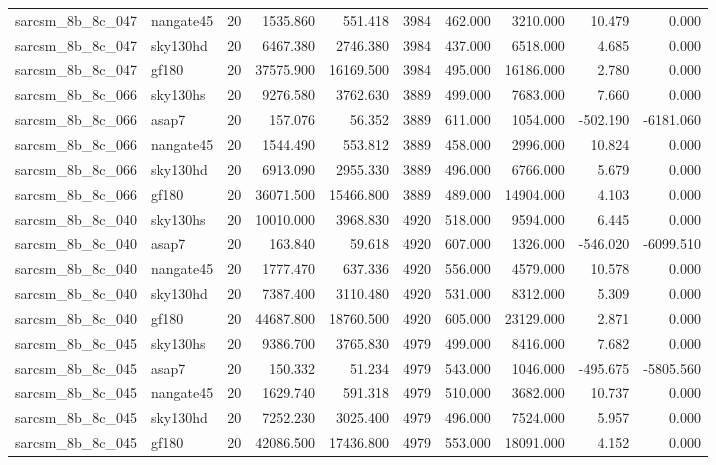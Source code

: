 \begin{longtable}{llrrrrrrrr}
sarcsm\_8b\_8c\_047 & nangate45 & 20 & 1535.860 & 551.418 & 3984 & 462.000 & 3210.000 & 10.479 & 0.000 \\
sarcsm\_8b\_8c\_047 & sky130hd & 20 & 6467.380 & 2746.380 & 3984 & 437.000 & 6518.000 & 4.685 & 0.000 \\
sarcsm\_8b\_8c\_047 & gf180 & 20 & 37575.900 & 16169.500 & 3984 & 495.000 & 16186.000 & 2.780 & 0.000 \\
sarcsm\_8b\_8c\_066 & sky130hs & 20 & 9276.580 & 3762.630 & 3889 & 499.000 & 7683.000 & 7.660 & 0.000 \\
sarcsm\_8b\_8c\_066 & asap7 & 20 & 157.076 & 56.352 & 3889 & 611.000 & 1054.000 & -502.190 & -6181.060 \\
sarcsm\_8b\_8c\_066 & nangate45 & 20 & 1544.490 & 553.812 & 3889 & 458.000 & 2996.000 & 10.824 & 0.000 \\
sarcsm\_8b\_8c\_066 & sky130hd & 20 & 6913.090 & 2955.330 & 3889 & 496.000 & 6766.000 & 5.679 & 0.000 \\
sarcsm\_8b\_8c\_066 & gf180 & 20 & 36071.500 & 15466.800 & 3889 & 489.000 & 14904.000 & 4.103 & 0.000 \\
sarcsm\_8b\_8c\_040 & sky130hs & 20 & 10010.000 & 3968.830 & 4920 & 518.000 & 9594.000 & 6.445 & 0.000 \\
sarcsm\_8b\_8c\_040 & asap7 & 20 & 163.840 & 59.618 & 4920 & 607.000 & 1326.000 & -546.020 & -6099.510 \\
sarcsm\_8b\_8c\_040 & nangate45 & 20 & 1777.470 & 637.336 & 4920 & 556.000 & 4579.000 & 10.578 & 0.000 \\
sarcsm\_8b\_8c\_040 & sky130hd & 20 & 7387.400 & 3110.480 & 4920 & 531.000 & 8312.000 & 5.309 & 0.000 \\
sarcsm\_8b\_8c\_040 & gf180 & 20 & 44687.800 & 18760.500 & 4920 & 605.000 & 23129.000 & 2.871 & 0.000 \\
sarcsm\_8b\_8c\_045 & sky130hs & 20 & 9386.700 & 3765.830 & 4979 & 499.000 & 8416.000 & 7.682 & 0.000 \\
sarcsm\_8b\_8c\_045 & asap7 & 20 & 150.332 & 51.234 & 4979 & 543.000 & 1046.000 & -495.675 & -5805.560 \\
sarcsm\_8b\_8c\_045 & nangate45 & 20 & 1629.740 & 591.318 & 4979 & 510.000 & 3682.000 & 10.737 & 0.000 \\
sarcsm\_8b\_8c\_045 & sky130hd & 20 & 7252.230 & 3025.400 & 4979 & 496.000 & 7524.000 & 5.957 & 0.000 \\
sarcsm\_8b\_8c\_045 & gf180 & 20 & 42086.500 & 17436.800 & 4979 & 553.000 & 18091.000 & 4.152 & 0.000 \\

\end{longtable}
